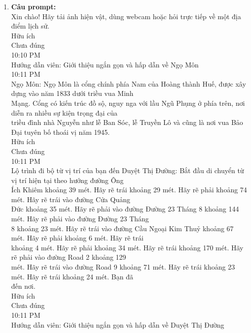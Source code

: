 \begin{enumerate}
\item \textbf{Câu prompt:} \\
\* Xin chào! Hãy tải ảnh hiện vật, dùng webcam hoặc hỏi trực tiếp về một địa điểm lịch sử. \\



   Hữu ích \\
   Chưa đúng \\
   10:10 PM \\
   Hướng dẫn viên: Giới thiệu ngắn gọn và hấp dẫn về Ngọ Môn \\

   10:11 PM \\
   Ngọ Môn: Ngọ Môn là cổng chính phía Nam của Hoàng thành Huế, được xây dựng vào năm 1833 dưới triều vua Minh \\
   Mạng. Cổng có kiến trúc đồ sộ, nguy nga với lầu Ngũ Phụng ở phía trên, nơi diễn ra nhiều sự kiện trọng đại của \\
   triều đình nhà Nguyễn như lễ Ban Sóc, lễ Truyền Lô và cũng là nơi vua Bảo Đại tuyên bố thoái vị năm 1945. \\


   Hữu ích \\
   Chưa đúng \\
   10:11 PM \\
   Lộ trình đi bộ từ vị trí của bạn đến Duyệt Thị Đường: Bắt đầu di chuyển từ vị trí hiện tại theo hướng đường Ông \\
   Ích Khiêm khoảng 39 mét. Hãy rẽ trái khoảng 29 mét. Hãy rẽ phải khoảng 74 mét. Hãy rẽ trái vào đường Cửa Quảng \\
   Đức khoảng 35 mét. Hãy rẽ phải vào đường Đường 23 Tháng 8 khoảng 144 mét. Hãy rẽ phải vào đường Đường 23 Tháng \\
   8 khoảng 23 mét. Hãy rẽ trái vào đường Cầu Ngoại Kim Thuỷ khoảng 67 mét. Hãy rẽ phải khoảng 6 mét. Hãy rẽ trái \\
   khoảng 4 mét. Hãy rẽ phải khoảng 34 mét. Hãy rẽ trái khoảng 170 mét. Hãy rẽ phải vào đường Road 2 khoảng 129 \\
   mét. Hãy rẽ trái vào đường Road 9 khoảng 71 mét. Hãy rẽ trái khoảng 23 mét. Hãy rẽ trái khoảng 24 mét. Bạn đã \\
   đến nơi. \\


   Hữu ích \\
   Chưa đúng \\
   10:11 PM \\
   Hướng dẫn viên: Giới thiệu ngắn gọn và hấp dẫn về Duyệt Thị Đường \\


\end{enumerate}
